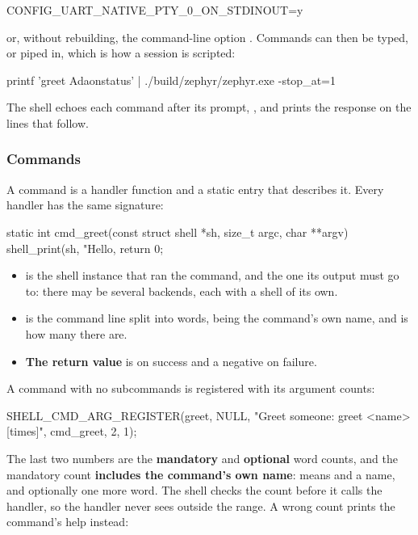 \begin{kconfigcode}
CONFIG_UART_NATIVE_PTY_0_ON_STDINOUT=y
\end{kconfigcode}

or, without rebuilding, the command-line option . Commands can then be typed,
or piped in, which is how a session is scripted:

\begin{shell}
printf 'greet Ada\nled on\nled status\n' | ./build/zephyr/zephyr.exe -stop_at=1
\end{shell}

The shell echoes each command after its prompt, , and prints the response on the lines
that follow.

\subsubsection{Commands}
A command is a handler function and a static entry that describes it. Every handler has the same
signature:

\begin{ccode}
static int cmd_greet(const struct shell *sh, size_t argc, char **argv)
{
	shell_print(sh, "Hello, %
	return 0;
}
\end{ccode}

\begin{itemize}
  \item \textbf{} is the shell instance that ran the command, and the one its output must go to:
    there may be several backends, each with a shell of its own.
  \item \textbf{} is the command line split into words, \textbf{} being the
    command’s own name, and \textbf{} is how many there are.
  \item \textbf{The return value} is  on success and a negative  on failure.
\end{itemize}

A command with no subcommands is registered with its argument counts:

\begin{ccode}
SHELL_CMD_ARG_REGISTER(greet, NULL, "Greet someone: greet <name> [times]", cmd_greet, 2, 1);
\end{ccode}

The last two numbers are the \textbf{mandatory} and \textbf{optional} word counts, and the mandatory
count \textbf{includes the command’s own name}:  means  and a name, and
optionally one more word. The shell checks the count before it calls the handler, so the handler
never sees  outside the range. A wrong count prints the command’s help instead:

